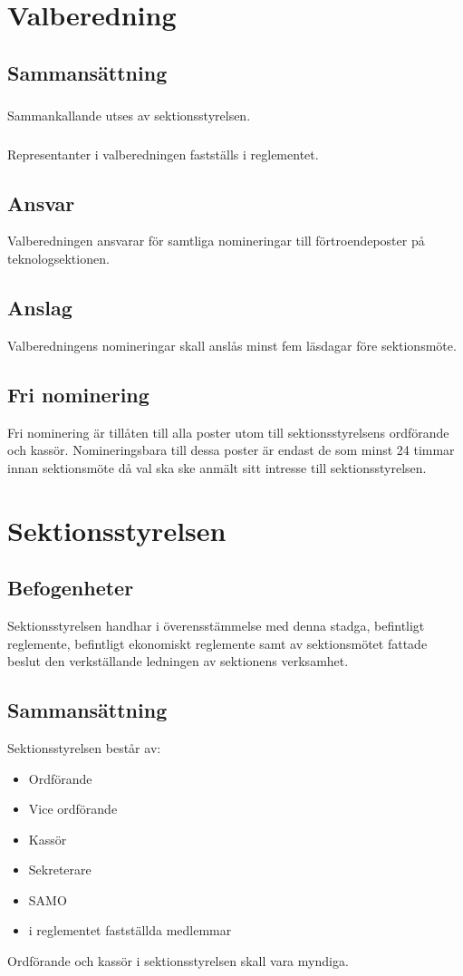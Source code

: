 \documentclass[a4paper]{dtek}
\begin{document}
\section{Valberedning}
\subsection{Sammansättning}
\subsubsection{}
Sammankallande utses av sektionsstyrelsen.
\subsubsection{}
Representanter i valberedningen fastställs i reglementet.
\subsection{Ansvar}
Valberedningen ansvarar för samtliga nomineringar till förtroendeposter på teknologsektionen.
\subsection{Anslag}
Valberedningens nomineringar skall anslås minst fem läsdagar före sektionsmöte.
\subsection{Fri nominering}
Fri nominering är tillåten till alla poster utom till sektionsstyrelsens ordförande och kassör. Nomineringsbara till dessa poster är endast de som minst 24 timmar innan sektionsmöte då val ska ske anmält sitt intresse till sektionsstyrelsen.
\newpage

\section{Sektionsstyrelsen}
\subsection{Befogenheter}
Sektionsstyrelsen handhar i överensstämmelse med denna stadga, befintligt reglemente, befintligt ekonomiskt reglemente samt av sektionsmötet fattade beslut den verkställande ledningen av sektionens verksamhet.
\subsection{Sammansättning}
Sektionsstyrelsen består av:
\begin{itemize}
\item Ordförande
\item Vice ordförande
\item Kassör
\item Sekreterare
\item SAMO
\item i reglementet fastställda medlemmar
\end{itemize}
Ordförande och kassör i sektionsstyrelsen skall vara myndiga.
\end{document}
